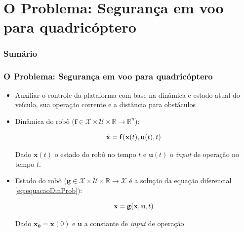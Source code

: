 \documentclass{beamer}
\begin{document}

\section{O Problema: Segurança em voo para quadricóptero}

\begin{frame}
	\frametitle{Sumário}
	\tableofcontents[currentsection]
\end{frame}

\begin{frame}[allowframebreaks]
	\frametitle{O Problema: Segurança em voo para quadricóptero}
	
	\begin{itemize}
		
		\item Auxíliar o controle da plataforma com base na dinâmica e estado  atual do veículo, sua operação corrente e a distância para obstáculos
		
		\item Dinâmica do robô ($\mathbf{f} \in \mathcal{X} \times \mathcal{U} \times \mathbb{R} \rightarrow \mathbb{R}^{n}$):
		
		\begin{equation}
		\centering
		\dot{\mathbf{x}} = \mathbf{f}(\mathbf{x}(t),\mathbf{u}(t),t)  
		\label{eq:equacaoDinProb}
		\end{equation}
		
		
		Dado $\mathbf{x}(t)$ o estado do robô no tempo $t$ e $\mathbf{u}(t)$ o \textit{input} de operação no tempo $t$.
		
		
		
		\item Estado do robô ($\mathbf{g} \in \mathcal{X} \times \mathcal{U} \times \mathbb{R} \rightarrow \mathcal{X}$ é a solução da equação diferencial \ref{eq:equacaoDinProb}):
		
		\begin{equation}
		\centering
		\mathbf{x} = \mathbf{g}(\mathbf{x},\mathbf{u},t)  
		\label{eq:equacaoPosProb}
		\end{equation}
		
		Dado $\mathbf{x_0} = \mathbf{x}(0)$ e $\mathbf{u}$ a constante de \textit{input} de operação				
		
		\framebreak
		

\end{itemize}
\end{frame}
\end{document}
